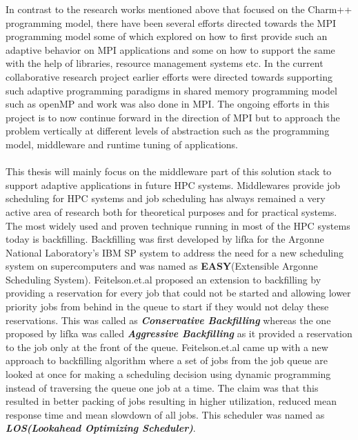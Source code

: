 In contrast to the research works mentioned above that focused on the Charm++ programming model, there have been several efforts directed towards the MPI programming model\cite{georgiou}\cite{travis}\cite{gladys}\cite{gonzalo}\cite{martin} some of which explored on how to first provide such an adaptive behavior on MPI applications and some on how to support the same with the help of libraries, resource management systems\cite{klein} etc. In the current collaborative research project earlier efforts were directed towards supporting such adaptive programming paradigms in shared memory programming model such as openMP\cite{andreas} and work was also done in MPI\cite{isaias}. The ongoing efforts in this project is to now continue forward in the direction of MPI but to approach the problem vertically at different levels of abstraction such as the programming model, middleware and runtime tuning of applications.\\ \\
This thesis will mainly focus on the middleware part of this solution stack to support adaptive applications in future HPC systems. Middlewares provide job scheduling for HPC systems and job scheduling has always remained a very active area of research both for theoretical purposes and for practical systems. The most widely used and proven technique running in most of the HPC systems today is backfilling. Backfilling was first developed by lifka\cite{david} for the Argonne National Laboratory's IBM SP system to address the need for a new scheduling system on supercomputers and was named as \textbf{EASY}(Extensible Argonne Scheduling System). Feitelson.et.al\cite{ahuva} proposed an extension to backfilling by providing a reservation for every job that could not be started and allowing lower priority jobs from behind in the queue to start if they would not delay these reservations. This was called as \textbf{\textit{Conservative Backfilling}} whereas the one proposed by lifka was called \textbf{\textit{Aggressive Backfilling}} as it provided a reservation to the job only at the front of the queue. Feitelson.et.al\cite{dror} came up with a new approach to backfilling algorithm where a set of jobs from the job queue are looked at once for making a scheduling decision using dynamic programming instead of traversing the queue one job at a time. The claim was that this resulted in better packing of jobs resulting in higher utilization, reduced mean response time and mean slowdown of all jobs. This scheduler was named as \textbf{\textit{LOS(Lookahead Optimizing Scheduler)}}.\\ \\
